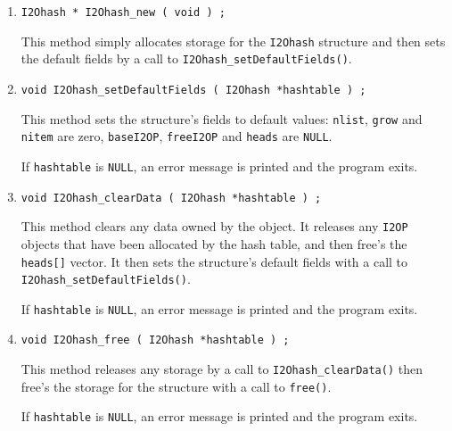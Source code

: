 \begin{enumerate}
\item
\begin{verbatim}
I2Ohash * I2Ohash_new ( void ) ;
\end{verbatim}
This method simply allocates storage for the {\tt I2Ohash} structure 
and then sets the default fields by a call to 
{\tt I2Ohash\_setDefaultFields()}.
\item
\begin{verbatim}
void I2Ohash_setDefaultFields ( I2Ohash *hashtable ) ;
\end{verbatim}
This method sets the structure's fields to default values:
{\tt nlist}, {\tt grow} and {\tt nitem} are zero,
{\tt baseI2OP}, {\tt freeI2OP} and {\tt heads} are {\tt NULL}.
\par {}
If {\tt hashtable} is {\tt NULL},
an error message is printed and the program exits.
\item
\begin{verbatim}
void I2Ohash_clearData ( I2Ohash *hashtable ) ;
\end{verbatim}
This method clears any data owned by the object.
It releases any {\tt I2OP} objects that have been allocated by the
hash table, and then free's the {\tt heads[]} vector.
It then sets the structure's default fields 
with a call to {\tt I2Ohash\_setDefaultFields()}.
\par {}
If {\tt hashtable} is {\tt NULL},
an error message is printed and the program exits.
\item
\begin{verbatim}
void I2Ohash_free ( I2Ohash *hashtable ) ;
\end{verbatim}
This method releases any storage by a call to 
{\tt I2Ohash\_clearData()} then free's the storage for the 
structure with a call to {\tt free()}.
\par {}
If {\tt hashtable} is {\tt NULL},
an error message is printed and the program exits.
\end{enumerate}
\par
